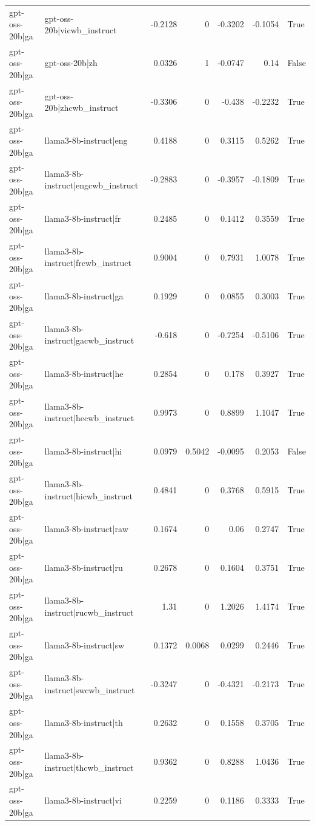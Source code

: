 \begin{table}
\begin{tabular}{l l r r r r l}
gpt-oss-20b|ga & gpt-oss-20b|vicwb_instruct & -0.2128 & 0 & -0.3202 & -0.1054 & True \\
gpt-oss-20b|ga & gpt-oss-20b|zh & 0.0326 & 1 & -0.0747 & 0.14 & False \\
gpt-oss-20b|ga & gpt-oss-20b|zhcwb_instruct & -0.3306 & 0 & -0.438 & -0.2232 & True \\
gpt-oss-20b|ga & llama3-8b-instruct|eng & 0.4188 & 0 & 0.3115 & 0.5262 & True \\
gpt-oss-20b|ga & llama3-8b-instruct|engcwb_instruct & -0.2883 & 0 & -0.3957 & -0.1809 & True \\
gpt-oss-20b|ga & llama3-8b-instruct|fr & 0.2485 & 0 & 0.1412 & 0.3559 & True \\
gpt-oss-20b|ga & llama3-8b-instruct|frcwb_instruct & 0.9004 & 0 & 0.7931 & 1.0078 & True \\
gpt-oss-20b|ga & llama3-8b-instruct|ga & 0.1929 & 0 & 0.0855 & 0.3003 & True \\
gpt-oss-20b|ga & llama3-8b-instruct|gacwb_instruct & -0.618 & 0 & -0.7254 & -0.5106 & True \\
gpt-oss-20b|ga & llama3-8b-instruct|he & 0.2854 & 0 & 0.178 & 0.3927 & True \\
gpt-oss-20b|ga & llama3-8b-instruct|hecwb_instruct & 0.9973 & 0 & 0.8899 & 1.1047 & True \\
gpt-oss-20b|ga & llama3-8b-instruct|hi & 0.0979 & 0.5042 & -0.0095 & 0.2053 & False \\
gpt-oss-20b|ga & llama3-8b-instruct|hicwb_instruct & 0.4841 & 0 & 0.3768 & 0.5915 & True \\
gpt-oss-20b|ga & llama3-8b-instruct|raw & 0.1674 & 0 & 0.06 & 0.2747 & True \\
gpt-oss-20b|ga & llama3-8b-instruct|ru & 0.2678 & 0 & 0.1604 & 0.3751 & True \\
gpt-oss-20b|ga & llama3-8b-instruct|rucwb_instruct & 1.31 & 0 & 1.2026 & 1.4174 & True \\
gpt-oss-20b|ga & llama3-8b-instruct|sw & 0.1372 & 0.0068 & 0.0299 & 0.2446 & True \\
gpt-oss-20b|ga & llama3-8b-instruct|swcwb_instruct & -0.3247 & 0 & -0.4321 & -0.2173 & True \\
gpt-oss-20b|ga & llama3-8b-instruct|th & 0.2632 & 0 & 0.1558 & 0.3705 & True \\
gpt-oss-20b|ga & llama3-8b-instruct|thcwb_instruct & 0.9362 & 0 & 0.8288 & 1.0436 & True \\
gpt-oss-20b|ga & llama3-8b-instruct|vi & 0.2259 & 0 & 0.1186 & 0.3333 & True \\

\end{tabular}
\end{table}
